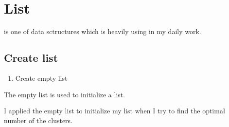 \documentclass[letterpaper,12pt,english]{sphinxmanual}
\begin{document}
\section{List}
\label{\detokenize{struct:list}}
 is one of data sctructures which is heavily using in my daily work.


\subsection{Create list}
\label{\detokenize{struct:create-list}}\begin{enumerate}
\def\theenumi{\arabic{enumi}}
\def\labelenumi{\theenumi .}
\makeatletter\def\p@enumii{\p@enumi \theenumi .}\makeatother
\item {} 
Create empty list

\end{enumerate}

The empty list is used to initialize a list.

\begin{quote}

\begin{sphinxVerbatim}[commandchars=\\\{\}]
  \PYG{p}{[}\PYG{p}{]}
\end{sphinxVerbatim}
\end{quote}

\begin{quote}

\begin{sphinxVerbatim}[commandchars=\\\{\}]
\end{sphinxVerbatim}
\end{quote}

I applied the empty list to initialize my  list when I try to find the
optimal number of the clusters.
\end{document}
